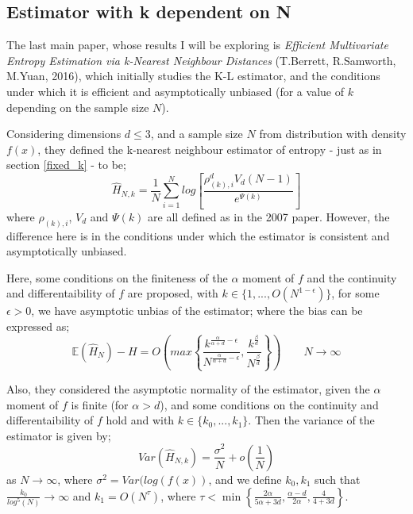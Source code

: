 \documentclass{report}
\begin{document}
\subsection{Estimator with k dependent on N} \label{dependent_k}

The last main paper, whose results I will be exploring is \textit{Efficient Multivariate Entropy Estimation via k-Nearest Neighbour Distances} (T.Berrett, R.Samworth, M.Yuan, 2016), which initially studies the K-L estimator, and the conditions under which it is efficient and asymptotically unbiased (for a value of $k$ depending on the sample size $N$). 

Considering dimensions $d \leq 3$, and a sample size $N$ from distribution with density $f(x)$, they defined the k-nearest neighbour estimator of entropy - just as in section \ref{fixed_k} - to be;
\begin{equation}
\hat{H}_{N, k} = \frac{1}{N} \sum_{i=1}^{N} log \left[ \frac{\rho_{(k),i}^{d} V_{d} (N-1)}{e^{\Psi(k)}} \right]
\end{equation}
where $\rho_{(k),i}$, $V_{d}$ and $\Psi(k)$ are all defined as in the 2007 paper. However, the difference here is in the conditions under which the estimator is consistent and asymptotically unbiased.

Here, some conditions on the finiteness of the $\alpha$ moment of $f$ and the continuity and differentaibility of $f$ are proposed, with $k \in \{1, ..., O(N^{1-\epsilon})\}$, for some $\epsilon > 0$, we have asymptotic unbias of the estimator; where the bias can be expressed as;
\begin{equation}
\mathbb{E} ( \hat{H}_{N} ) - H = O \left( max \left\{ \frac{k^{\frac{\alpha}{\alpha + d} - \epsilon}}{N^{\frac{\alpha}{\alpha + d} - \epsilon}}, \frac{k^{\frac{\beta}{d}}}{N^{\frac{\beta}{d}}} \right\} \right) \quad \quad N \to \infty
\end{equation}

Also, they considered the asymptotic normality of the estimator, given the $\alpha$ moment of $f$ is finite (for $\alpha > d$), and some conditions on the continuity and differentaibility of $f$ hold and with $k \in \{k_{0}, ..., k_{1}\}$. Then the variance of the estimator is given by;
\begin{equation}
Var(\hat{H}_{N, k}) = \frac{\sigma^2}{N} + o(\frac{1}{N})
\end{equation}
as $N \to \infty$, where $\sigma^2 = Var(log(f(x))$, and we define $k_{0}, k_{1}$ such that $\frac{k_{0}}{log^5(N)} \to \infty$ and $k_{1} = O(N^{\tau})$, where $\tau < \min \left\{ \frac{2 \alpha}{5 \alpha + 3d} , \frac{\alpha - d}{2 \alpha} , \frac{4}{4 + 3d} \right\}$. 
\end{document}
